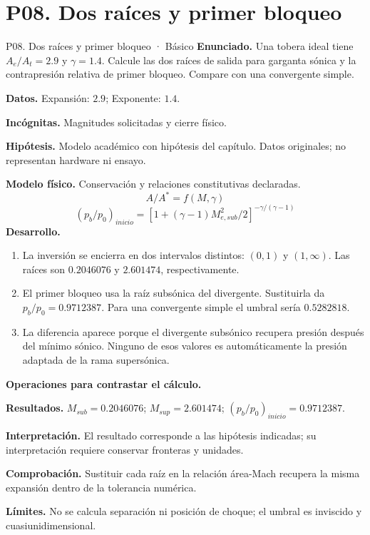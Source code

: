 \section{P08. Dos raíces y primer bloqueo}
\begin{studiumworked}{P08. Dos raíces y primer bloqueo · Básico}
\textbf{Enunciado.} Una tobera ideal tiene $A_e/A_t=2.9$ y $\gamma=1.4$. Calcule las dos raíces de salida para garganta sónica y la contrapresión relativa de primer bloqueo. Compare con una convergente simple.

\textbf{Datos.} Expansión: $2.9$; Exponente: $1.4$.

\textbf{Incógnitas.} Magnitudes solicitadas y cierre físico.

\textbf{Hipótesis.} Modelo académico con hipótesis del capítulo. Datos originales; no representan hardware ni ensayo.

\textbf{Modelo físico.} Conservación y relaciones constitutivas declaradas.
\[A/A^*=f(M,\gamma)\]
\[(p_b/p_0)_{inicio}=[1+(\gamma-1)M_{e,sub}^2/2]^{-\gamma/(\gamma-1)}\]
\textbf{Desarrollo.}
\begin{enumerate}
\item La inversión se encierra en dos intervalos distintos: $(0,1)$ y $(1,\infty)$. Las raíces son $0.2046076$ y $2.601474$, respectivamente.
\item El primer bloqueo usa la raíz subsónica del divergente. Sustituirla da $p_b/p_0=0.9712387$. Para una convergente simple el umbral sería $0.5282818$.
\item La diferencia aparece porque el divergente subsónico recupera presión después del mínimo sónico. Ninguno de esos valores es automáticamente la presión adaptada de la rama supersónica.
\end{enumerate}
\textbf{Operaciones para contrastar el cálculo.}

\textbf{Resultados.} $M_{sub}=0.2046076$; $M_{sup}=2.601474$; $(p_b/p_0)_{inicio}=0.9712387$.

\textbf{Interpretación.} El resultado corresponde a las hipótesis indicadas; su interpretación requiere conservar fronteras y unidades.

\textbf{Comprobación.} Sustituir cada raíz en la relación área-Mach recupera la misma expansión dentro de la tolerancia numérica.

\textbf{Límites.} No se calcula separación ni posición de choque; el umbral es inviscido y cuasiunidimensional.
\end{studiumworked}
